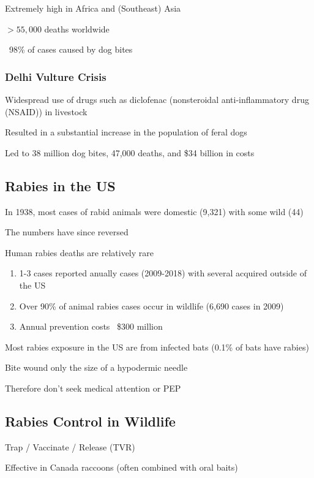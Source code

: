 \documentclass{notes}
\begin{document}
Extremely high in Africa and (Southeast) Asia

\(>55,000\) deaths worldwide

~98\% of cases caused by dog bites

\subsubsection{Delhi Vulture Crisis}

Widespread use of drugs such as diclofenac (nonsteroidal anti-inflammatory drug (NSAID)) in livestock

\tab \indicates Resulted in a substantial increase in the population of feral dogs

\tab \indicates Led to 38 million dog bites, 47,000 deaths, and \$34 billion in costs

\subsection{Rabies in the US}

In 1938, most cases of rabid animals were domestic (9,321) with some wild (44)

\tab \indicates The numbers have since reversed

Human rabies deaths are relatively rare

\begin{enumerate}
    \item 1-3 cases reported anually
     cases (2009-2018) with several acquired outside of the US
    \item Over 90\% of animal rabies cases occur in wildlife (6,690 cases in 2009)
    \item Annual prevention costs ~\$300 million
\end{enumerate}

Most rabies exposure in the US are from infected bats (0.1\% of bats have rabies)

\tab Bite wound only the size of a hypodermic needle

\tab \indicates Therefore don't seek medical attention or PEP

\subsection{Rabies Control in Wildlife}

Trap / Vaccinate / Release (TVR)

\tab \indicates Effective in Canada raccoons (often combined with oral baits)
\end{document}
